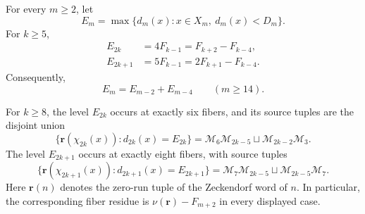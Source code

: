 \begin{theorem}
\label{thm:second-largest-fibers}
For every \(m\ge2\), let
\[
 E_m=\max\{d_m(x):x\in X_m,\ d_m(x)<D_m\}.
\]
For \(k\ge5\),
\begin{align}
 E_{2k}&=4F_{k-1}=F_{k+2}-F_{k-4},
 \label{eq:second-largest-even-window}\\
 E_{2k+1}&=5F_{k-1}=2F_{k+1}-F_{k-4}.
 \label{eq:second-largest-odd-window}
\end{align}
Consequently,
\[
 E_m=E_{m-2}+E_{m-4}\qquad(m\ge14).
\]

For \(k\ge8\), the level \(E_{2k}\) occurs at exactly six fibers, and its
source tuples are the disjoint union
\begin{equation}
 \{\mathbf r(\chi_{2k}(x)):d_{2k}(x)=E_{2k}\}
 =\mathscr M_6\mathscr M_{2k-5}
  \sqcup\mathscr M_{2k-2}\mathscr M_3.
 \label{eq:second-largest-even-source-tuples}
\end{equation}
The level \(E_{2k+1}\) occurs at exactly eight fibers, with source tuples
\begin{equation}
 \{\mathbf r(\chi_{2k+1}(x)):d_{2k+1}(x)=E_{2k+1}\}
 =\mathscr M_7\mathscr M_{2k-5}
  \sqcup\mathscr M_{2k-5}\mathscr M_7.
 \label{eq:second-largest-odd-source-tuples}
\end{equation}
Here \(\mathbf r(n)\) denotes the zero-run tuple of the Zeckendorf word of
\(n\).  In particular, the corresponding fiber residue is
\(\nu(\mathbf r)-F_{m+2}\) in every displayed case.
\end{theorem}

